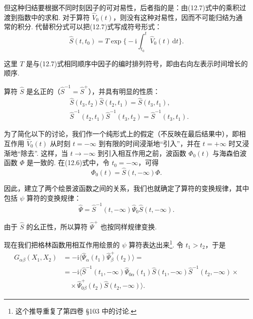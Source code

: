 但这种归结要根据不同时刻因子的可对易性，后者指的是：由(12.7)式中的乘积过渡到指数中的求和. 对于算符 $\hat V_0(t)$，则没有这种对易性，因而不可能归结为通常的积分. 代替积分式可以把(12.7)式写成符号形式：
\begin{equation}
\hat S(t,t_0)=T\exp\Big\{-\mathrm{i}\int_{t_0}^{t}\hat V_0(t)\,\mathrm{d}t\Big\}.
\end{equation}

这里 $T$ 是与(12.7)式相同顺序中因子的编时排列符号，即由右向左表示时间增长的顺序.

算符 $\hat S$ 是幺正的（$\hat S^{-1}=\hat S^{+}$），并具有明显的性质：
\begin{equation}
\begin{aligned}
&\hat S(t_3,t_2)\hat S(t_2,t_1)=\hat S(t_3,t_1),\\
&\hat S^{-1}(t_2,t_1)\hat S^{-1}(t_3,t_2)=\hat S^{-1}(t_3,t_1).
\end{aligned}
\end{equation}

为了简化以下的讨论，我们作一个纯形式上的假定（不反映在最后结果中），即相互作用 $\hat V_0(t)$ 从时刻 $t=-\infty$ 到有限的时间浸渐地“引入”，并在 $t=+\infty$ 时又浸渐地“除去”. 这样，当 $t\to-\infty$ 到引入相互作用之前，波函数 $\varPhi_0(t)$ 与海森伯波函数 $\varPhi$ 是一致的. 在(12.6)式中，令 $t_0=-\infty$，可得
\begin{equation}
\varPhi_0(t)=\hat S(t,-\infty)\varPhi.
\end{equation}

因此，建立了两个绘景波函数之间的关系，我们也就确定了算符的变换规律，其中包括 $\psi$ 算符的变换规律：
\begin{equation}
\hat\Psi=\hat S^{-1}(t,-\infty)\hat\Psi_0\hat S(t,-\infty).
\end{equation}

由于 $\hat S$ 的幺正性，所以算符 $\hat\Psi^{+}$ 也按同样规律变换.

现在我们把格林函数用相互作用绘景的 $\psi$ 算符表达出来\footnote{这个推导重复了第四卷 §103 中的讨论.}. 令 $t_1>t_2$，于是
\begin{equation*}
\begin{aligned}
G_{\alpha\beta}(X_1,X_2)&=-\mathrm{i}\langle\hat\Psi_\alpha(t_1)\hat\Psi^{+}_\beta(t_2)\rangle=\\
&=-\mathrm{i}\big\langle\hat S^{-1}(t_1,-\infty)\hat\Psi_{0\alpha}(t_1)\hat S(t_1,-\infty)\hat S^{-1}(t_2,-\infty)\times\\
&\quad\times\hat\Psi^{+}_{0\beta}(t_2)\hat S(t_2,-\infty)\big\rangle.
\end{aligned}
\end{equation*}

